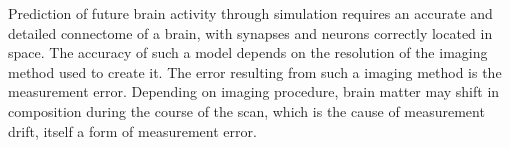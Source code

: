 Prediction of future brain activity through simulation requires an accurate and
detailed connectome of a brain, with synapses and neurons correctly located in
space.\autocite{bostrom_whole_2008} The accuracy of such a model depends on the
resolution of the imaging method used to create it. The error resulting from
such a imaging method is the measurement error. Depending on imaging procedure, brain matter may shift in composition during the course of the scan, which is the cause of measurement drift, itself a form of measurement error.



